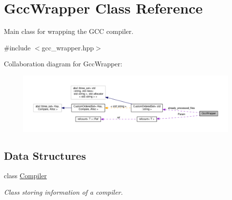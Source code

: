 \hypertarget{classGccWrapper}{}\section{Gcc\+Wrapper Class Reference}
\label{classGccWrapper}


Main class for wrapping the G\+CC compiler.  




{\ttfamily \#include $<$gcc\+\_\+wrapper.\+hpp$>$}



Collaboration diagram for Gcc\+Wrapper\+:
\nopagebreak
\begin{figure}[H]
\begin{center}
\leavevmode
\includegraphics[width=350pt]{d3/d9e/classGccWrapper__coll__graph}
\end{center}
\end{figure}
\subsection*{Data Structures}
\begin{DoxyCompactItemize}
\item 
class \hyperlink{classGccWrapper_1_1Compiler}{Compiler}
\begin{DoxyCompactList}\small\item\em Class storing information of a compiler. \end{DoxyCompactList}\end{DoxyCompactItemize}
